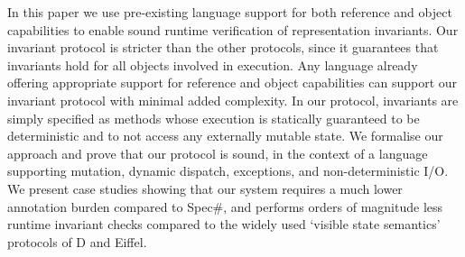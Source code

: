 In this paper we use pre-existing language support for both reference and object capabilities to enable sound runtime verification of representation invariants.
Our invariant protocol is stricter than the other  protocols, since it guarantees that invariants hold for all objects involved in execution.
Any language already offering appropriate support for reference and object capabilities can support our invariant protocol with minimal added complexity.
In our protocol, invariants are simply specified as methods whose execution is statically guaranteed to be deterministic and to not access any externally mutable state.
We formalise our approach and prove that our protocol is sound, in the context of a language supporting mutation, dynamic dispatch, exceptions, and non-deterministic I/O.
We present case studies showing that our system requires a much lower annotation burden compared to Spec\#, and performs orders of magnitude less runtime invariant checks compared to the widely used `visible state semantics' protocols of D and Eiffel.
